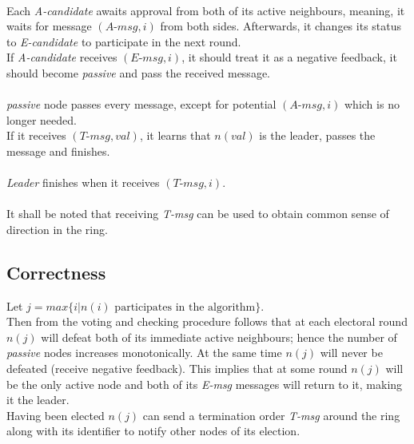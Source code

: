\documentclass{article}
\begin{document}
\\
Each \textit{A-candidate} awaits approval from both of its active neighbours, meaning, it waits for message $(\textit{A-msg},i)$ from both sides. Afterwards, it changes its status to \textit{E-candidate} to participate in the next round.\\
If \textit{A-candidate} receives $(\textit{E-msg},i)$, it should treat it as a negative feedback, it should become \textit{passive} and pass the received message.\\
\\
\textit{passive} node passes every message, except for potential $(\textit{A-msg},i)$ which is no longer needed.\\
If it receives $(\textit{T-msg},val)$, it learns that $n(val)$ is the leader, passes the message and finishes.\\
\\
\textit{Leader} finishes when it receives $(\textit{T-msg},i)$.\\
\\
It shall be noted that receiving \textit{T-msg} can be used to obtain common sense of direction in the ring.
\newpage
\subsection*{Correctness}
Let $j=max\{i | n(i) \text{ participates in the algorithm}\}$. \\
Then from the voting and checking procedure follows that at each electoral round $n(j)$ will defeat both of its immediate active neighbours; hence the number of \textit{passive} nodes increases monotonically. At the same time $n(j)$ will never be defeated (receive negative feedback). This implies that at some round $n(j)$ will be the only active node and both of its \textit{E-msg} messages will return to it, making it the leader.\\
Having been elected $n(j)$ can send a termination order \textit{T-msg} around the ring along with its identifier to notify other nodes of its election.
\end{document}
